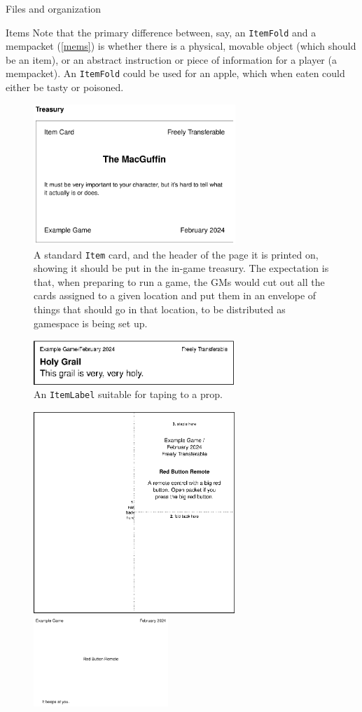 \documentclass[sheet]{GameTexBase}
\begin{document}
\begin{section}{Files and organization}
\begin{subsection}{Items}
Note that the primary difference between, say, an \lstinline|ItemFold| and a mempacket (\ref{mems}) is whether there is a physical, movable object (which should be an item), or an abstract instruction or piece of information for a player (a mempacket).  An \lstinline|ItemFold| could be used for an apple, which when eaten could either be tasty or poisoned.
\begin{figure}
\centering
\includegraphics[width=3in]{item-card}
\caption{A standard \lstinline|Item| card, and the header of the page it is printed on, showing it should be put in the in-game treasury.  The expectation is that, when preparing to run a game, the GMs would cut out all the cards assigned to a given location and put them in an envelope of things that should go in that location, to be distributed as gamespace is being set up.
}
\label{itemcardfig}
\end{figure}\begin{figure}
\centering
\includegraphics[width=3in]{item-label}
\caption{An \lstinline|ItemLabel| suitable for taping to a prop.}
\label{itemlabelfig}
\end{figure}
\begin{figure}
\centering
\includegraphics[width=3in]{item-fold-front} \includegraphics[width=2in]{item-fold-back}

\end{figure}
\end{subsection}
\end{section}
\end{document}

